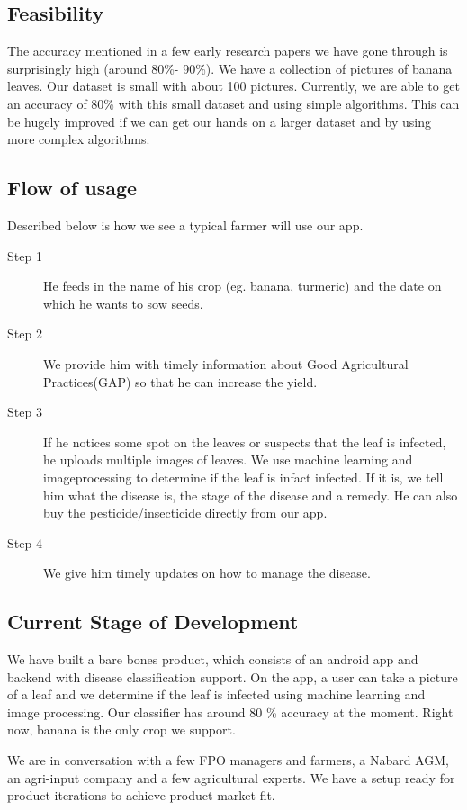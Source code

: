 \documentclass[a4paper]{article}
\begin{document}
\subsection{Feasibility}
The accuracy mentioned in a few early research papers we have gone through is surprisingly high (around 80\%- 90\%).
We have a collection of pictures of banana leaves. Our dataset is small with about 100 pictures. 
Currently, we are able to get an accuracy of 80\% with this small dataset and using simple algorithms.
This can be hugely improved if we can get our hands on a larger dataset and by using more complex algorithms. 

\subsection{Flow of usage}
Described below is how we see a typical farmer will use our app. 

\begin{description}
\item[Step 1] He feeds in the name of his crop (eg. banana, turmeric) and the date on which he wants to sow seeds.  

\item[Step 2] We provide him with timely information about Good Agricultural Practices(GAP) so that he can increase the yield. 
\item[Step 3] If he notices some spot on the leaves or suspects that the leaf is infected, he 
 uploads multiple images of leaves. We use machine learning and imageprocessing
 to determine if the leaf is infact infected. If it is, we tell him what the disease is, the stage of the disease and a remedy. 
He can also buy the pesticide/insecticide directly from our app. 
\item[Step 4] We give him timely updates on how to manage the disease.
\end{description}


\subsection{Current Stage of Development}
We have built a bare bones product, which consists of an android app and backend with disease classification support. 
On the app, a user can take a picture of a leaf and we determine if the leaf is infected using machine learning and image processing.
Our classifier has around 80 \% accuracy at the moment.
Right now, banana is the only crop we support.

We are in conversation with a few FPO managers and farmers, a Nabard AGM, an agri-input company and a few agricultural experts. We have a setup ready for product iterations to achieve product-market fit.
\end{document}
